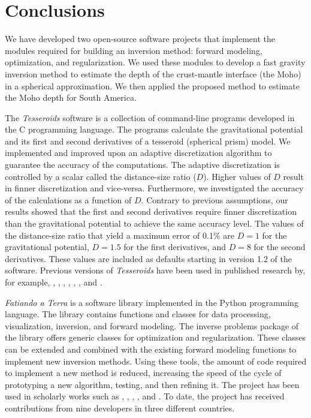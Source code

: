 \chapter{Conclusions}


We have developed two open-source software projects that implement the
modules required for building an inversion method: forward modeling,
optimization, and regularization.
We used these modules to develop a fast gravity inversion method to estimate
the depth of the crust-mantle interface (the Moho) in a spherical
approximation.
We then applied the proposed method to estimate the Moho depth for South
America.

The \textit{Tesseroids} software is a collection of command-line
programs developed in the C programming language.
The programs calculate the gravitational potential and its first and second
derivatives of a tesseroid (spherical prism) model.
We implemented and improved upon an adaptive discretization algorithm to
guarantee the accuracy of the computations.
The adaptive discretization is controlled by a scalar called the distance-size
ratio ($D$).
Higher values of $D$ result in finner discretization and vice-versa.
Furthermore, we investigated the accuracy of the calculations as a function of
$D$.
Contrary to previous assumptions, our results showed that the first and second
derivatives require finner discretization than the gravitational potential to
achieve the same accuracy level.
The values of the distance-size ratio that yield a maximum error of 0.1\%
are $D = 1$ for the gravitational potential, $D = 1.5$ for the first
derivatives, and $D = 8$ for the second derivatives.
These values are included as defaults starting in version 1.2 of the software.
Previous versions of \textit{Tesseroids} have been used in published research
by, for example,
\citet{braitenberg2011}, \citet{alvarez2012}, \citet{bouman2013},
\citet{bouman2013a}, \citet{mariani2013}, \citet{braitenberg2015}, and
\citet{fullea2015a}.

\textit{Fatiando a Terra} is a software library implemented in the Python
programming language.
The library contains functions and classes for data processing, visualization,
inversion, and forward modeling.
The inverse problems package of the library offers generic classes for
optimization and regularization.
These classes can be extended and combined with the existing forward modeling
functions to implement new inversion methods.
Using these tools, the amount of code required to implement a new method is
reduced, increasing the speed of the cycle of prototyping a new algorithm,
testing, and then refining it.
The project has been used in scholarly works such as
\citet{carlos2014}, \citet{hidalgo-gato2015a}, \citet{niccoli2015},
\citet{oliveirajr.2015}, and \citet{bassett2016}.
To date, the project has received contributions from nine developers in three
different countries.

